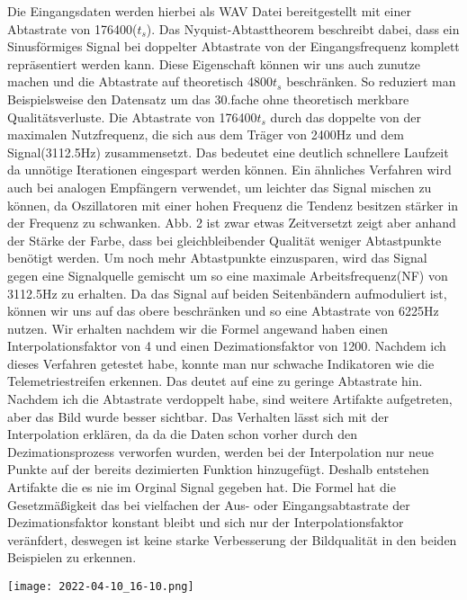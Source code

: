 \begin{multicols*}{2}
    Die Eingangsdaten werden hierbei als WAV Datei bereitgestellt mit einer Abtastrate von 176400(\( t_s \)). Das Nyquist-Abtasttheorem beschreibt dabei, dass ein Sinusförmiges Signal bei doppelter Abtastrate von der Eingangsfrequenz komplett repräsentiert werden kann. Diese Eigenschaft können wir uns auch zunutze machen und die Abtastrate auf theoretisch 4800\( t_s \) beschränken. So reduziert man Beispielsweise den Datensatz um das 30.fache ohne theoretisch merkbare Qualitätsverluste. Die Abtastrate von 176400\( t_s \) durch das doppelte von der maximalen Nutzfrequenz, die sich aus dem Träger von 2400Hz und dem Signal(3112.5Hz) zusammensetzt. Das bedeutet eine deutlich schnellere Laufzeit da unnötige Iterationen eingespart werden können. Ein ähnliches Verfahren wird auch bei analogen Empfängern verwendet, um leichter das Signal mischen zu können, da Oszillatoren mit einer hohen Frequenz die Tendenz besitzen stärker in der Frequenz zu schwanken. 
    Abb. 2 ist zwar etwas Zeitversetzt zeigt aber anhand der Stärke der Farbe, dass bei gleichbleibender Qualität weniger Abtastpunkte benötigt werden. Um noch mehr Abtastpunkte einzusparen, wird das Signal gegen eine Signalquelle gemischt um so eine maximale Arbeitsfrequenz(NF) von 3112.5Hz zu erhalten. Da das Signal auf beiden Seitenbändern aufmoduliert ist, können wir uns auf das obere beschränken und so eine Abtastrate von 6225Hz nutzen. Wir erhalten nachdem wir die Formel angewand haben einen Interpolationsfaktor von 4 und einen Dezimationsfaktor von 1200. Nachdem ich dieses Verfahren getestet habe, konnte man nur schwache Indikatoren wie die Telemetriestreifen erkennen. Das deutet auf eine zu geringe Abtastrate hin. Nachdem ich die Abtastrate verdoppelt habe, sind weitere Artifakte aufgetreten, aber das Bild wurde besser sichtbar. Das Verhalten lässt sich mit der Interpolation erklären, da da die Daten schon vorher durch den Dezimationsprozess verworfen wurden, werden bei der Interpolation nur neue Punkte auf der bereits dezimierten Funktion hinzugefügt. Deshalb entstehen Artifakte die es nie im Orginal Signal gegeben hat. Die Formel hat die Gesetzmäßigkeit das bei vielfachen der Aus- oder Eingangsabtastrate der Dezimationsfaktor konstant bleibt und sich nur der Interpolationsfaktor veränfdert, deswegen ist keine starke Verbesserung der Bildqualität in den beiden Beispielen zu erkennen.

    \begin{center}
        \centering
        \texttt{[image: 2022-04-10\_16-10.png]}
    \end{center} 


\end{multicols*}
